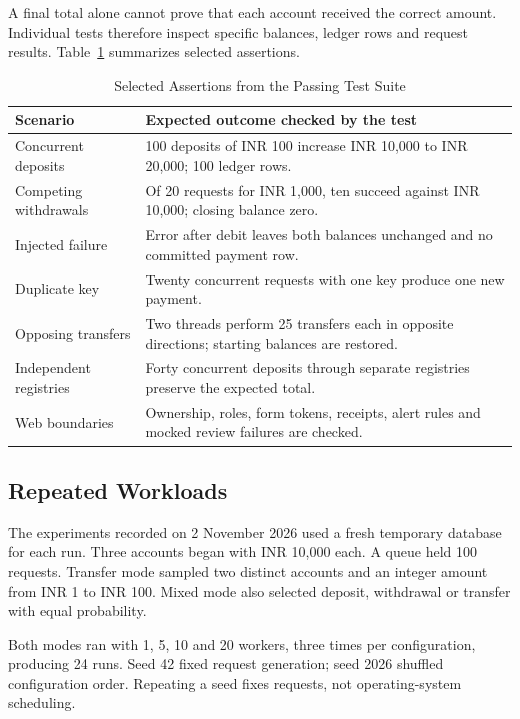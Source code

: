 \documentclass[conference]{IEEEtran}
\begin{document}
A final total alone cannot prove that each account received the correct amount. Individual tests therefore inspect specific balances, ledger rows and request results. Table~\ref{tab:tests} summarizes selected assertions.

\begin{table}[t]
\caption{Selected Assertions from the Passing Test Suite}
\label{tab:tests}
\centering\footnotesize
\begin{tabularx}{\columnwidth}{@{}p{}X@{}}
\toprule
Scenario & Expected outcome checked by the test\\
\midrule
Concurrent deposits & 100 deposits of INR 100 increase INR 10,000 to INR 20,000; 100 ledger rows.\\
Competing withdrawals & Of 20 requests for INR 1,000, ten succeed against INR 10,000; closing balance zero.\\
Injected failure & Error after debit leaves both balances unchanged and no committed payment row.\\
Duplicate key & Twenty concurrent requests with one key produce one new payment.\\
Opposing transfers & Two threads perform 25 transfers each in opposite directions; starting balances are restored.\\
Independent registries & Forty concurrent deposits through separate registries preserve the expected total.\\
Web boundaries & Ownership, roles, form tokens, receipts, alert rules and mocked review failures are checked.\\
\bottomrule
\end{tabularx}
\end{table}

\subsection{Repeated Workloads}
The experiments recorded on 2 November 2026 used a fresh temporary database for each run. Three accounts began with INR 10,000 each. A queue held 100 requests. Transfer mode sampled two distinct accounts and an integer amount from INR 1 to INR 100. Mixed mode also selected deposit, withdrawal or transfer with equal probability.

Both modes ran with 1, 5, 10 and 20 workers, three times per configuration, producing 24 runs. Seed 42 fixed request generation; seed 2026 shuffled configuration order. Repeating a seed fixes requests, not operating-system scheduling.
\end{document}
